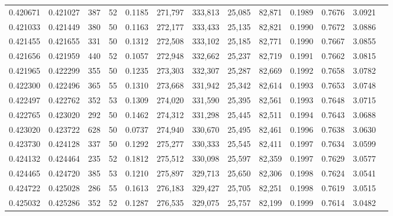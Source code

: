 \begin{tabular}{rrrrrrrrrrrrr}
0.420671 & 0.421027 &   387 &  52 &                                     0.1185 & 271,797 & 333,813 &  25,085 &  82,871 & 0.1989 & 0.7676 & 3.0921 \\
0.421033 & 0.421449 &   380 &  50 &                                     0.1163 & 272,177 & 333,433 &  25,135 &  82,821 & 0.1990 & 0.7672 & 3.0886 \\
0.421455 & 0.421655 &   331 &  50 &                                     0.1312 & 272,508 & 333,102 &  25,185 &  82,771 & 0.1990 & 0.7667 & 3.0855 \\
0.421656 & 0.421959 &   440 &  52 &                                     0.1057 & 272,948 & 332,662 &  25,237 &  82,719 & 0.1991 & 0.7662 & 3.0815 \\
0.421965 & 0.422299 &   355 &  50 &                                     0.1235 & 273,303 & 332,307 &  25,287 &  82,669 & 0.1992 & 0.7658 & 3.0782 \\
0.422300 & 0.422496 &   365 &  55 &                                     0.1310 & 273,668 & 331,942 &  25,342 &  82,614 & 0.1993 & 0.7653 & 3.0748 \\
0.422497 & 0.422762 &   352 &  53 &                                     0.1309 & 274,020 & 331,590 &  25,395 &  82,561 & 0.1993 & 0.7648 & 3.0715 \\
0.422765 & 0.423020 &   292 &  50 &                                     0.1462 & 274,312 & 331,298 &  25,445 &  82,511 & 0.1994 & 0.7643 & 3.0688 \\
0.423020 & 0.423722 &   628 &  50 &                                     0.0737 & 274,940 & 330,670 &  25,495 &  82,461 & 0.1996 & 0.7638 & 3.0630 \\
0.423730 & 0.424128 &   337 &  50 &                                     0.1292 & 275,277 & 330,333 &  25,545 &  82,411 & 0.1997 & 0.7634 & 3.0599 \\
0.424132 & 0.424464 &   235 &  52 &                                     0.1812 & 275,512 & 330,098 &  25,597 &  82,359 & 0.1997 & 0.7629 & 3.0577 \\
0.424465 & 0.424720 &   385 &  53 &                                     0.1210 & 275,897 & 329,713 &  25,650 &  82,306 & 0.1998 & 0.7624 & 3.0541 \\
0.424722 & 0.425028 &   286 &  55 &                                     0.1613 & 276,183 & 329,427 &  25,705 &  82,251 & 0.1998 & 0.7619 & 3.0515 \\
0.425032 & 0.425286 &   352 &  52 &                                     0.1287 & 276,535 & 329,075 &  25,757 &  82,199 & 0.1999 & 0.7614 & 3.0482 \\

\end{tabular}
